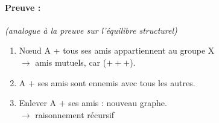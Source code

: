 \paragraph{Preuve : } \textit{(analogue à la preuve sur l'équilibre structurel)}


\begin{enumerate}

\item Nœud A + tous ses amis appartiennent au groupe X \\
$\to$ amis mutuels, car ($+++$).

\item A $+$ ses amis sont ennemis avec tous les autres.

\item Enlever A $+$ ses amis : nouveau graphe.\\
$\to$ raisonnement récursif

\end{enumerate}
